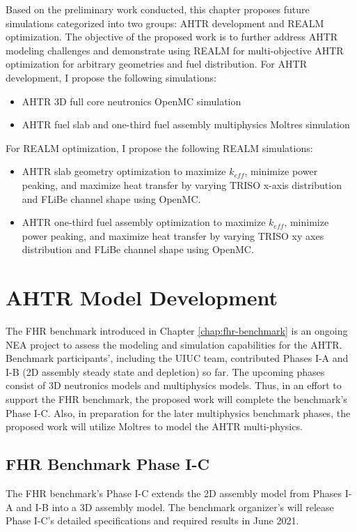 Based on the preliminary work conducted, this chapter proposes 
future simulations categorized into two groups: \gls{AHTR} development and 
\gls{REALM} optimization. 
The objective of the proposed work is to further address \gls{AHTR} modeling
challenges and demonstrate using \gls{REALM} for multi-objective \gls{AHTR} 
optimization for arbitrary geometries and fuel distribution. 
For \gls{AHTR} development, I propose the following simulations: 
\begin{itemize}
    \item \gls{AHTR} 3D full core neutronics OpenMC simulation
    \item \gls{AHTR} fuel slab and one-third fuel assembly multiphysics 
    Moltres simulation
\end{itemize}
For \gls{REALM} optimization, I propose the following \gls{REALM} simulations: 
\begin{itemize}
    \item \gls{AHTR} slab geometry optimization to maximize $k_{eff}$, 
    minimize power peaking, and maximize heat transfer by varying \gls{TRISO} 
    x-axis distribution and \gls{FLiBe} channel shape using OpenMC. 
    \item \gls{AHTR} one-third fuel assembly optimization to maximize $k_{eff}$, 
    minimize power peaking, and maximize heat transfer by varying \gls{TRISO} 
    xy axes distribution and \gls{FLiBe} channel shape using OpenMC.
\end{itemize}

\section{AHTR Model Development}
The \gls{FHR} benchmark introduced in Chapter \ref{chap:fhr-benchmark} is an 
ongoing \gls{NEA} project to assess the modeling and simulation capabilities 
for the \gls{AHTR}. 
Benchmark participants', including the \gls{UIUC} team, contributed Phases I-A 
and I-B (2D assembly steady state and depletion) so far.  
The upcoming phases consist of 3D neutronics models and multiphysics models. 
Thus, in an effort to support the \gls{FHR} benchmark, the proposed work will 
complete the benchmark's Phase I-C.
Also, in preparation for the later multiphysics benchmark phases, the proposed 
work will utilize Moltres to model the \gls{AHTR} multi-physics.

\subsection{FHR Benchmark Phase I-C}
The \gls{FHR} benchmark's Phase I-C extends the 2D assembly model from Phases 
I-A and I-B into a 3D assembly model. 
The benchmark organizer's will release Phase I-C's detailed specifications and 
required results in June 2021.

